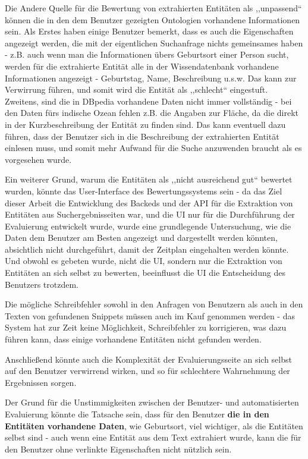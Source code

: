Die Andere Quelle für die Bewertung von extrahierten Entitäten als ,,unpassend`` können die in den dem Benutzer gezeigten Ontologien vorhandene Informationen sein. Als Erstes haben einige Benutzer bemerkt, dass es auch die Eigenschaften angezeigt werden, die mit der eigentlichen Suchanfrage nichts gemeinsames haben - z.B. auch wenn man die Informationen übers Geburtsort einer Person sucht, werden für die extrahierte Entität alle in der Wissendatenbank vorhandene Informationen angezeigt - Geburtstag, Name, Beschreibung u.s.w. Das kann zur Verwirrung führen, und somit wird die Entität als ,,schlecht`` eingestuft. Zweitens, sind die in DBpedia vorhandene Daten nicht immer vollständig - bei den Daten fürs indische Ozean fehlen z.B. die Angaben zur Fläche, da die direkt in der Kurzbeschreibung der Entität zu finden sind. Das kann eventuell dazu führen, dass der Benutzer sich in die Beschreibung der extrahierten Entität einlesen muss, und somit mehr Aufwand für die Suche anzuwenden braucht als es vorgesehen wurde. 

Ein weiterer Grund, warum die Entitäten als ,,nicht ausreichend gut`` bewertet wurden, könnte das User-Interface des Bewertungssystems sein - da das Ziel dieser Arbeit die Entwicklung des Backeds und der API für die Extraktion von Entitäten aus Suchergebnisseiten war, und die UI nur für die Durchführung der Evaluierung entwickelt wurde, wurde eine grundlegende Untersuchung, wie die Daten dem Benutzer am Besten angezeigt und dargestellt werden könnten, absichtlich nicht durchgeführt, damit der Zeitplan eingehalten werden könnte. Und obwohl es gebeten wurde, nicht die UI, sondern nur die Extraktion von Entitäten an sich selbst zu bewerten, beeinflusst die UI die Entscheidung des Benutzers trotzdem. 

Die mögliche Schreibfehler sowohl in den Anfragen von Benutzern als auch in den Texten von gefundenen Snippets müssen auch im Kauf genommen werden - das System hat zur Zeit keine Möglichkeit, Schreibfehler zu korrigieren, was dazu führen kann, dass einige vorhandene Entitäten nicht gefunden werden.

Anschließend könnte auch die Komplexität der Evaluierungsseite an sich selbst auf den Benutzer verwirrend wirken, und so für schlechtere Wahrnehmung der Ergebnissen sorgen.

Der Grund für die Unstimmigkeiten zwischen der Benutzer- und automatisierten Evaluierung könnte die Tatsache sein, dass für den Benutzer \textbf{die in den Entitäten vorhandene Daten}, wie Geburtsort, viel wichtiger, als die Entitäten selbst sind - auch wenn eine Entität aus dem Text extrahiert wurde, kann die für den Benutzer ohne verlinkte Eigenschaften nicht nützlich sein.
